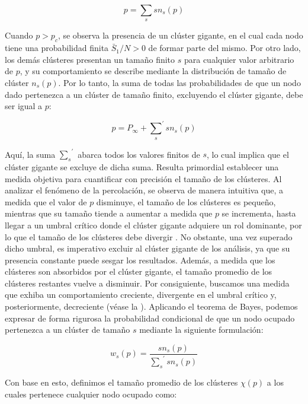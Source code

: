 \begin{equation}\label{eq:12}
p=\sum_{s}{sn_s}(p)
\end{equation}

Cuando $p > p_c$, se observa la presencia de un clúster gigante, en el cual cada nodo tiene una probabilidad finita $\bar{S}_1/N > 0$ de formar parte del mismo. Por otro lado, los demás clústeres presentan un tamaño finito $s$ para cualquier valor arbitrario de $p$, y su comportamiento se describe mediante la distribución de tamaño de clúster $n_s(p)$. Por lo tanto, la suma de todas las probabilidades de que un nodo dado pertenezca a un clúster de tamaño finito, excluyendo el clúster gigante, debe ser igual a $p$:

\begin{equation}\label{eq:13}
	p=P_\infty+{\sum_{s}}^{\prime}sn_s(p) 
\end{equation}

Aquí, la suma ${\sum_{s}}^{\prime}$ abarca todos los valores finitos de $s$, lo cual implica que el clúster gigante se excluye de dicha suma. Resulta primordial establecer una medida objetiva para cuantificar con precisión el tamaño de los clústeres.  Al analizar el fenómeno de la percolación, se observa de manera intuitiva que, a medida que el valor de $p$ disminuye, el tamaño de los clústeres es pequeño, mientras que su tamaño tiende a aumentar a medida que $p$ se incrementa, hasta llegar a un umbral crítico donde el clúster gigante adquiere un rol dominante, por lo que el tamaño de los clústeres debe divergir \cite{saberi_recent_2015}. No obstante, una vez superado dicho umbral, es imperativo excluir al clúster gigante de los análisis, ya que su presencia constante puede sesgar los resultados. Además, a medida que los clústeres son absorbidos por el clúster gigante, el tamaño promedio de los clústeres restantes vuelve a disminuir. Por consiguiente, buscamos una medida que exhiba un comportamiento creciente, divergente en el umbral crítico y, posteriormente, decreciente (véase la ). Aplicando el teorema de Bayes, podemos expresar de forma rigurosa la probabilidad condicional de que un nodo ocupado pertenezca a un clúster de tamaño $s$ mediante la siguiente formulación:

\begin{equation}\label{eq:14}
w_s(p) = \frac{sn_s(p)}{{\sum_{s}}^{\prime}sn_s(p)}
\end{equation}

Con base en esto, definimos el tamaño promedio de los clústeres $\chi(p)$  a los cuales pertenece cualquier nodo ocupado como:

